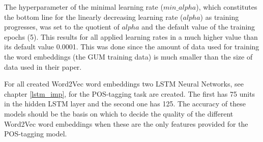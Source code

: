The hyperparameter of the minimal learning rate ($min\_alpha$), which constitutes the bottom line for the linearly decreasing learning rate ($alpha$) as training progresses, was set to the quotient of $alpha$ and the default value of the training epochs (5). This results for all applied learning rates in a much higher value than its default value 0.0001. This was done since the amount of data used for training the word embeddings (the GUM training data) is much smaller than the size of data \citet{mikolov2013efficient} used in their paper.

For all created Word2Vec word embeddings two LSTM Neural Networks, see chapter \ref{lstm_imp}, for the POS-tagging task are created. The first has 75 units in the hidden LSTM layer and the second one has 125. The accuracy of these models should be the basis on which to decide the quality of the different Word2Vec word embeddings when these are the only features provided for the POS-tagging model.

